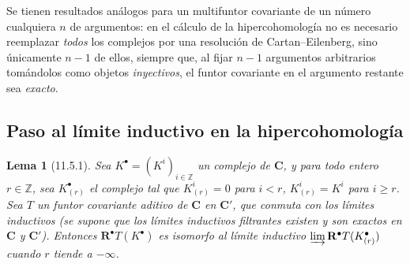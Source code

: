 \documentclass[10pt,oneside,openany]{book}
\theoremstyle{egaenv}\newtheorem*{env}{---}
\theoremstyle{egastatement}
\newtheorem*{lemma}{Lema}
\theoremstyle{egadescription}
\newcommand{\oldpage}[2][]{\marginnote{\normalfont\scriptsize\textbf{#1}\,|\,#2}\ignorespaces}
\renewcommand{\geq}{\geqslant}
\begin{document}
Se tienen resultados análogos para un multifuntor covariante de un número cualquiera $n$ de argumentos: en el cálculo de la hipercohomología no es necesario reemplazar \emph{todos} los complejos
por una resolución de Cartan--Eilenberg, sino únicamente $n-1$ de ellos, siempre que, al fijar $n-1$ argumentos arbitrarios tomándolos como objetos \emph{inyectivos}, el funtor covariante en el argumento restante sea \emph{exacto}.


\subsection{Paso al límite inductivo en la hipercohomología}
\label{subsection:0.11.5}
\label{subsection:0.11.5-fr}

\begin{lemma}[11.5.1]
\label{0.11.5.1-fr}
Sea $K^\bullet=(K^i)_{i\in\mathbb Z}$ un complejo de $\boldsymbol{C}$, y para todo entero $r\in\mathbb Z$, sea $K_{(r)}^\bullet$ el complejo tal que $K_{(r)}^i=0$ para $i<r$, $K_{(r)}^i=K^i$ para $i\geq r$. Sea $T$ un funtor covariante aditivo
\oldpage[0\textsubscript{III}]{36}
de $\boldsymbol{C}$ en $\boldsymbol{C}'$, que conmuta con los límites inductivos (se supone que los límites inductivos filtrantes existen y son exactos en $\boldsymbol{C}$ y $\boldsymbol{C}'$). Entonces $\mathbf R^\bullet T(K^\bullet)$ es isomorfo al límite inductivo $\varinjlim\mathbf R^\bullet T(K_{(r)}^\bullet)$ cuando $r$ tiende a $-\infty$.
\end{lemma}
\end{document}
